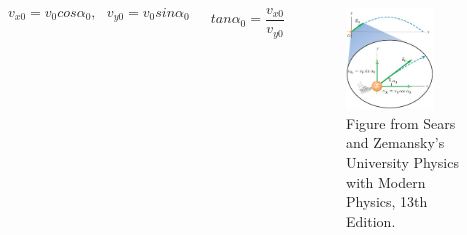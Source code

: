 \documentclass[]{beamer}
\begin{document}
\begin{frame}
   
  


  


    \begin{columns}[c]
        \column{2.3in}  %
       

        \begin{equation*}
            v_{x0}=v_0cos\alpha_0, \ \ \  v_{y0}=v_0sin\alpha_0
          \end{equation*}
          
        
          \begin{equation*}
        tan \alpha_0=\frac{v_{x0}}{v_{y0}}
          \end{equation*}
        
      

        \column{2.5in}
        
  
        \begin{figure}[h!]  
            \includegraphics[width=0.7\textwidth]{images/20.jpg}
             \caption{ {\tiny Figure from Sears and Zemansky's University Physics 
             with Modern Physics, 13th Edition.} }
          \end{figure}
           
     
        \end{columns}

     
    
            
  
  \end{frame}
  
\end{document}
